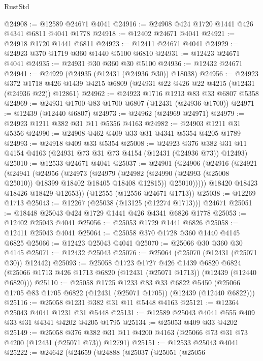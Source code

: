 \begin{lexlean}{RustStd}
\begin{coremodule}
@24908 := @12589 @24671 @4041
@24916 := @24908 @424 @1720 @1441 @426 @4341 @6811 @4041 @1778
@24918 := @12402 @24671 @4041
@24921 := @24918 @1720 @1441 @6811
@24923 := @12411 @24671 @4041
@24929 := @24923 @370 @1719 @360 @1440 @5100 @6810
@24931 := @12423 @24671 @4041
@24935 := @24931 @30 @360 @30 @5100
@24936 := @12432 @24671
@24941 := @24929 (@24935 (@12431 (@24936 @30)) @18038)
@24956 := @24923
    @372
    @1718
    @426
    @1439
    @4215
    @6809
    (@24931 @22 @426 @22 @4215 (@12431 (@24936 @22)) @12861)
@24962 := @24923 @1716 @1213 @83 @33 @6807 @5358
@24969 := @24931 @1700 @83 @1700 @6807 (@12431 (@24936 @1700))
@24971 := @12439 (@12440 @6807)
@24973 := @24962 (@24969 @24971)
@24979 := @24923 @1211 @382 @31 @11 @5356 @4163
@24982 := @24903 @1211 @31 @5356
@24990 := @24908 @462 @409 @33 @31 @4341 @5354 @4205 @1789
@24993 := @24918 @409 @33 @5354
@25008 := @24923
    @376
    @382
    @31
    @11
    @4154
    @4163
    (@24931 @73 @31 @73 @4154 (@12431 (@24936 @73)) @12493)
@25010 := @12533 @24671 @4041
@25037 := @24901
    (@24906
      (@24916
        (@24921
          (@24941
            (@24956
              (@24973
                (@24979
                  (@24982 (@24990 (@24993 (@25008 @25010)) @18399 @18402 @18405 @18408 @12815))
                  @25010)))))
        @18420
        @18423
        @18426
        @18429
        @12653))
    (@12555 (@12556 @24671 @1713))
@25038 := @12269 @1713
@25043 := @12267 (@25038 (@13125 (@12274 @1713))) @24671
@25051 := @18448 @25043 @424 @1729 @1441 @426 @4341 @6826 @1778
@25053 := @12402 @25043 @4041
@25056 := @25053 @1729 @1441 @6826
@25058 := @12411 @25043 @4041
@25064 := @25058 @370 @1728 @360 @1440 @4145 @6825
@25066 := @12423 @25043 @4041
@25070 := @25066 @30 @360 @30 @4145
@25071 := @12432 @25043
@25076 := @25064 (@25070 (@12431 (@25071 @30)) @12442)
@25093 := @25058
    @1723
    @1727
    @426
    @1439
    @6820
    @6824
    (@25066 @1713 @426 @1713 @6820 (@12431 (@25071 @1713)) (@12439 (@12440 @6820)))
@25110 := @25058
    @1725
    @1233
    @83
    @33
    @6822
    @5450
    (@25066 @1705 @83 @1705 @6822 (@12431 (@25071 @1705)) (@12439 (@12440 @6822)))
@25116 := @25058 @1231 @382 @31 @11 @5448 @4163
@25121 := @12364 @25043 @4041 @1231 @31 @5448
@25131 := @12589 @25043 @4041 @555 @409 @33 @31 @4341 @4202 @4205 @1795
@25134 := @25053 @409 @33 @4202
@25149 := @25058
    @376
    @382
    @31
    @11
    @4200
    @4163
    (@25066 @73 @31 @73 @4200 (@12431 (@25071 @73)) @12791)
@25151 := @12533 @25043 @4041
@25222 := @24642
    (@24659
      (@24888
        (@25037
          (@25051
            (@25056

\end{coremodule}
\end{lexlean}
